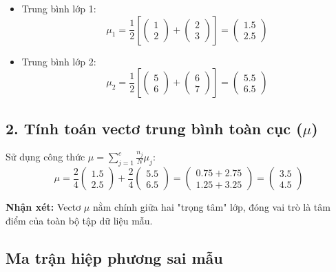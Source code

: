 \begin{itemize}
    \item Trung bình lớp 1:
    \[
    \mu_1 = \frac{1}{2} \left[ \begin{pmatrix} 1 \\ 2 \end{pmatrix} + \begin{pmatrix} 2 \\ 3 \end{pmatrix} \right] = \begin{pmatrix} 1.5 \\ 2.5 \end{pmatrix}
    \]
    \item Trung bình lớp 2:
    \[
    \mu_2 = \frac{1}{2} \left[ \begin{pmatrix} 5 \\ 6 \end{pmatrix} + \begin{pmatrix} 6 \\ 7 \end{pmatrix} \right] = \begin{pmatrix} 5.5 \\ 6.5 \end{pmatrix}
    \]
\end{itemize}

\subsection*{2. Tính toán vectơ trung bình toàn cục ($\mu$)}

Sử dụng công thức $\mu = \sum_{j=1}^{c} \frac{n_j}{N} \mu_j$:
\[
\mu = \frac{2}{4} \begin{pmatrix} 1.5 \\ 2.5 \end{pmatrix} + \frac{2}{4} \begin{pmatrix} 5.5 \\ 6.5 \end{pmatrix} = \begin{pmatrix} 0.75 + 2.75 \\ 1.25 + 3.25 \end{pmatrix} = \begin{pmatrix} 3.5 \\ 4.5 \end{pmatrix}
\]

\noindent \textbf{Nhận xét:} Vectơ $\mu$ nằm chính giữa hai "trọng tâm" lớp, đóng vai trò là tâm điểm của toàn bộ tập dữ liệu mẫu.

\subsection{Ma trận hiệp phương sai mẫu}

